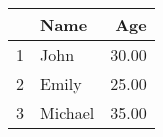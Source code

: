 \begin{table}[ht]
\centering
\begin{tabular}{rlr}
  \hline
 & Name & Age \\ 
  \hline
1 & John & 30.00 \\ 
  2 & Emily & 25.00 \\ 
  3 & Michael & 35.00 \\ 
   \hline
\end{tabular}
\end{table}
